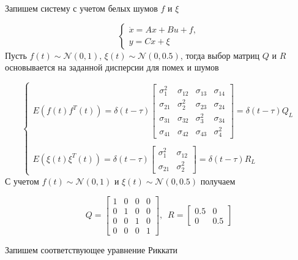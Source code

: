 Запишем систему с учетом белых шумов $f$ и $\xi$

\begin{equation}
	\begin{cases}
		\dot{x} = Ax + Bu + f,\\
		y = Cx + \xi
	\end{cases}
\end{equation}
Пусть $f(t) \sim \mathcal{N}(0,1)$, $\xi (t) \sim \mathcal{N}(0,0.5)$, тогда выбор матриц $Q$ и $R$ основывается на заданной дисперсии для помех и шумов

\begin{equation}
	\begin{cases}
		E \left( f(t) f^T(t) \right) = \delta (t - \tau)
		\begin{bmatrix}
			\sigma^2_1 & \sigma_{12} & \sigma_{13} & \sigma_{14}\\
			\sigma_{21} & \sigma^2_{2} & \sigma_{23} & \sigma_{24}\\
			\sigma_{31} & \sigma_{32} & \sigma^2_{3} & \sigma_{34}\\
			\sigma_{41} & \sigma_{42} & \sigma_{43} & \sigma^2_{4}
		\end{bmatrix} = \delta(t-\tau) Q_L\\\\
		E \left( \xi(t) \xi^T(t) \right) =
		\delta (t - \tau)
		\begin{bmatrix}
			\sigma^2_1 & \sigma_{12}\\
			\sigma_{21} & \sigma^2_{2} 
		\end{bmatrix} = \delta(t-\tau) R_L
	\end{cases}
\end{equation}
С учетом $ f(t) \sim \mathcal{N}(0,1)$ и $ \xi(t)  \sim \mathcal{N}(0,0.5)$ получаем

\begin{equation}
	Q = \begin{bmatrix}
		1 & 0 & 0 & 0\\
		0 & 1 & 0 & 0\\
		0 & 0 & 1 & 0\\
		0 & 0 & 0 & 1
	\end{bmatrix}, \, \, \, 
	R=
	\begin{bmatrix}
		0.5 & 0\\
		0 & 0.5
	\end{bmatrix}
\end{equation}




Запишем соответствующее уравнение Риккати

